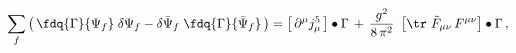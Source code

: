 \begin{equation}
\sum_f \left(\, \fdq{\Gamma}{\Psi_f} \; \delta \Psi_f  -
              \delta \bar \Psi_f   \;  \fdq{\Gamma}{\bar\Psi_f} \,\right)
= \left[\, \partial^\mu j_\mu^5 \,\right]\bullet \Gamma
\,+\, \frac{g^2}{8\,\pi^2} \,\,
\left[ \tr\,\,  \tilde F_{\mu\nu}\, F^{\mu\nu} \right]\bullet \Gamma
\,, \label{chirWIquant}
\end{equation}

